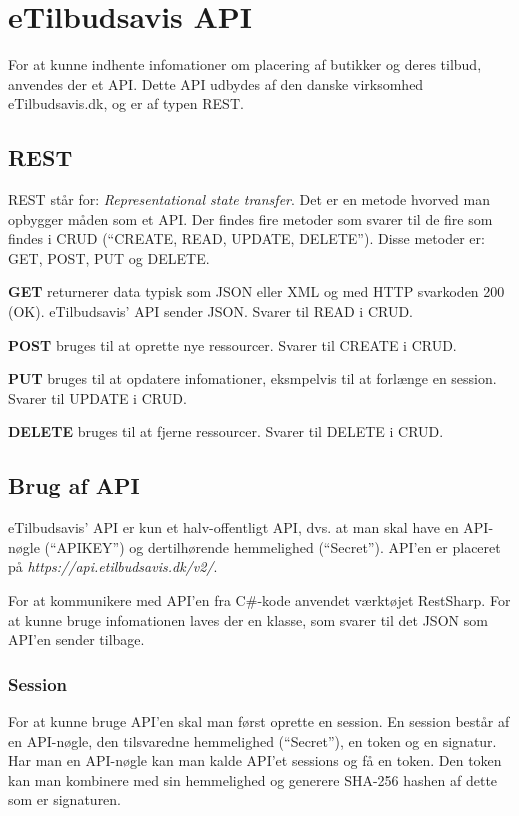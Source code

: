 \chapter{eTilbudsavis API}\label{api}
For at kunne indhente infomationer om placering af butikker og deres tilbud, anvendes der et API.
Dette API udbydes af den danske virksomhed eTilbudsavis.dk, og er af typen REST.

\section{REST}
REST står for: \textit{Representational state transfer}.
Det er en metode hvorved man opbygger måden som et API. 
Der findes fire metoder som svarer til de fire som findes i CRUD (``CREATE, READ, UPDATE, DELETE'').
Disse metoder er: GET, POST, PUT og DELETE.

\textbf{GET}
returnerer data typisk som JSON eller XML og med HTTP svarkoden 200 (OK). 
eTilbudsavis' API sender JSON. 
Svarer til READ i CRUD.

\textbf{POST}
bruges til at oprette nye ressourcer.
Svarer til CREATE i CRUD.

\textbf{PUT}
bruges til at opdatere infomationer, eksmpelvis til at forlænge en session.
Svarer til UPDATE i CRUD.

\textbf{DELETE}
bruges til at fjerne ressourcer. 
Svarer til DELETE i CRUD.

\section{Brug af API}
eTilbudsavis' API er kun et halv-offentligt API, dvs. at man skal have en API-nøgle (``APIKEY'') og dertilhørende hemmelighed (``Secret'').
API'en er placeret på \textit{https://api.etilbudsavis.dk/v2/}. \citep{eTilAPI}

For at kommunikere med API'en fra C\#-kode anvendet værktøjet RestSharp. \citep{RestSharp} 
For at kunne bruge infomationen laves der en klasse, som svarer til det JSON som API'en sender tilbage.

\subsection{Session}
For at kunne bruge API'en skal man først oprette en session. 
En session består af en API-nøgle, den tilsvaredne hemmelighed (``Secret''), en token og en signatur.
Har man en API-nøgle kan man kalde API'et sessions og få en token.
Den token kan man kombinere med sin hemmelighed og generere SHA-256 hashen af dette som er signaturen. 


